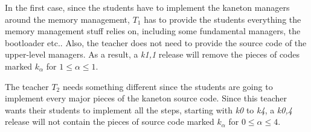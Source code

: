 In the first case, since the students have to implement the kaneton managers
around the memory management, $T_{1}$ has to provide the students everything
the memory management stuff relies on, including some fundamental managers,
the bootloader etc.. Also, the teacher does not need to provide the source
code of the upper-level managers. As a result, a \textit{k1,1} release will
remove the pieces of codes marked $k_{\alpha}$ for $1 \le \alpha \le 1$.

The teacher $T_{2}$ needs something different since the students are going
to implement every major pieces of the kaneton source code. Since this teacher
wants their students to implement all the steps, starting with \textit{k0}
to \textit{k4}, a \textit{k0,4} release will not contain the pieces of source
code marked $k_{\alpha}$ for $0 \le \alpha \le 4$.
